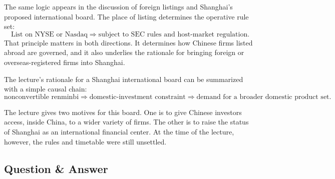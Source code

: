 The same logic appears in the discussion of foreign listings and Shanghai's proposed international board. The place of listing determines the operative rule set:
\begin{equation}
\text{List on NYSE or Nasdaq}
\Rightarrow
\text{subject to SEC rules and host-market regulation}.
\end{equation}
That principle matters in both directions. It determines how Chinese firms listed abroad are governed, and it also underlies the rationale for bringing foreign or overseas-registered firms into Shanghai.

The lecture's rationale for a Shanghai international board can be summarized with a simple causal chain:
\begin{equation}
\text{nonconvertible renminbi}
\Rightarrow
\text{domestic-investment constraint}
\Rightarrow
\text{demand for a broader domestic product set}.
\end{equation}

\begin{figure}[h]
\centering
{}
\end{figure}

The lecture gives two motives for this board. One is to give Chinese investors access, inside China, to a wider variety of firms. The other is to raise the status of Shanghai as an international financial center. At the time of the lecture, however, the rules and timetable were still unsettled.

\subsection{Question \& Answer}

